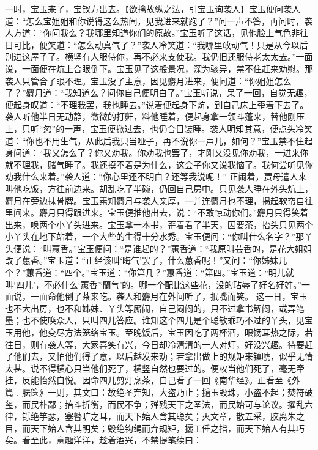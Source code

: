 \documentclass[12pt,oneside]{book}
\begin{document}
一时，宝玉来了，宝钗方出去。【欲擒故纵之法，引宝玉询袭人】宝玉便问袭人道：“怎么宝姐姐和你说得这么热闹，见我进来就跑了？”问一声不答，再问时，袭人方道：“你问我么？我哪里知道你们的原故。”宝玉听了这话，见他脸上气色非往日可比，便笑道：“怎么动真气了？”袭人冷笑道：“我哪里敢动气！只是从今以后别进这屋子了。横竖有人服侍你，再不必来支使我。我仍旧还服侍老太太去。”一面说，一面便在炕上合眼倒下。宝玉见了这般景况，深为骇异，禁不住赶来劝慰。那袭人只管合了眼不理。宝玉没了主意，因见麝月进来，便问道：“你姐姐怎么了？”麝月道：“我知道么？问你自己便明白了。”宝玉听说，呆了一回，自觉无趣，便起身叹道：“不理我罢，我也睡去。”说着便起身下炕，到自己床上歪着下去了。袭人听他半日无动静，微微的打鼾，料他睡着，便起身拿一领斗蓬来，替他刚压上，只听“忽”的一声，宝玉便掀过去，也仍合目装睡。袭人明知其意，便点头冷笑道：“你也不用生气，从此后我只当哑子，再不说你一声儿，如何？”宝玉禁不住起身问道：“我又怎么了？你又劝我。你劝我也罢了，才刚又没见你劝我，一进来你就不理我，赌气睡了。我还摸不着是为什么，这会子你又说我恼了。我何尝听见你劝我什么来着。”袭人道：“你心里还不明白？还等我说呢！”
正闹着，贾母遣人来叫他吃饭，方往前边来。胡乱吃了半碗，仍回自己房中。只见袭人睡在外头炕上，麝月在旁边抹骨牌。宝玉素知麝月与袭人亲厚，一并连麝月也不理，揭起软帘自往里间来。麝月只得跟进来。宝玉便推他出去，说：“不敢惊动你们。”麝月只得笑着出来，唤两个小丫头进来。宝玉拿一本书，歪着看了半天，因要茶，抬头只见两个小丫头在地下站着，一个大些的生得十分水秀。宝玉便问：“你叫什么名字？”那丫头便说：“叫蕙香。”宝玉便问：“是谁起的？”蕙香道：“我原叫芸香的，是花大姐姐改了蕙香。”宝玉道：“正经该叫‘晦气’罢了，什么蕙香呢！”又问：“你姊妹几个？”蕙香道：“四个。”宝玉道：“你第几？”蕙香道：“第四。”宝玉道：“明儿就叫‘四儿’，不必什么‘蕙香’‘蘭气’的。哪一个配比这些花，没的玷辱了好名好姓。”一面说，一面命他倒了茶来吃。袭人和麝月在外间听了，抿嘴而笑。
这一日，宝玉也不大出房，也不和姊妹、丫头等厮闹，自己闷闷的，只不过拿书解闷，或弄笔墨；也不使唤众人，只叫四儿答应。谁知这个四儿是个聪敏乖巧不过的丫头，见宝玉用他，他变尽方法笼络宝玉。至晚饭后，宝玉因吃了两杯酒，眼饧耳热之际，若往日，则有袭人等，大家喜笑有兴，今日却冷清清的一人对灯，好没兴趣。待要赶了他们去，又怕他们得了意，以后越发来劝；若拿出做上的规矩来镇唬，似乎无情太甚。说不得横心只当他们死了，横竖自然也要过的。便权当他们死了，毫无牵挂，反能怡然自悦。因命四儿剪灯烹茶，自己看了一回《南华经》。正看至《外篇﹒胠箧》一则，其文曰：故绝圣弃知，大盗乃止；擿玉毁珠，小盗不起；焚符破玺，而民朴鄙；掊斗折衡，而民不争；殚残天下之圣法，而民始可与论议。擢乱六律，铄绝竽瑟，塞瞽旷之耳，而天下始人含其聪矣；灭文章，散五采，胶离朱之目，而天下始人含其明矣；毁绝钩绳而弃规矩，攦工倕之指，而天下始人有其巧矣。看至此，意趣洋洋，趁着酒兴，不禁提笔续曰：
\end{document}
